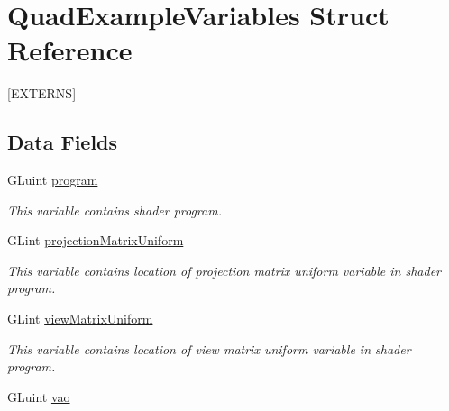 \hypertarget{structQuadExampleVariables}{\section{Quad\-Example\-Variables Struct Reference}
\label{structQuadExampleVariables}
}


\mbox{[}E\-X\-T\-E\-R\-N\-S\mbox{]}  


\subsection*{Data Fields}
\begin{DoxyCompactItemize}
\item 
\hypertarget{structQuadExampleVariables_a63971781ff860bd201886926f943ba78}{G\-Luint \hyperlink{structQuadExampleVariables_a63971781ff860bd201886926f943ba78}{program}}\label{structQuadExampleVariables_a63971781ff860bd201886926f943ba78}

\begin{DoxyCompactList}\small\item\em This variable contains shader program. \end{DoxyCompactList}\item 
\hypertarget{structQuadExampleVariables_a38a1023cb8ee3692e195ea574e43c51a}{G\-Lint \hyperlink{structQuadExampleVariables_a38a1023cb8ee3692e195ea574e43c51a}{projection\-Matrix\-Uniform}}\label{structQuadExampleVariables_a38a1023cb8ee3692e195ea574e43c51a}

\begin{DoxyCompactList}\small\item\em This variable contains location of projection matrix uniform variable in shader program. \end{DoxyCompactList}\item 
\hypertarget{structQuadExampleVariables_a9c505e0a089ecd495b18550309ebab77}{G\-Lint \hyperlink{structQuadExampleVariables_a9c505e0a089ecd495b18550309ebab77}{view\-Matrix\-Uniform}}\label{structQuadExampleVariables_a9c505e0a089ecd495b18550309ebab77}

\begin{DoxyCompactList}\small\item\em This variable contains location of view matrix uniform variable in shader program. \end{DoxyCompactList}\item 
\hypertarget{structQuadExampleVariables_a294c388653d62435d7eeb7994f45c4fc}{G\-Luint \hyperlink{structQuadExampleVariables_a294c388653d62435d7eeb7994f45c4fc}{vao}}\label{structQuadExampleVariables_a294c388653d62435d7eeb7994f45c4fc}


\end{DoxyCompactItemize}
